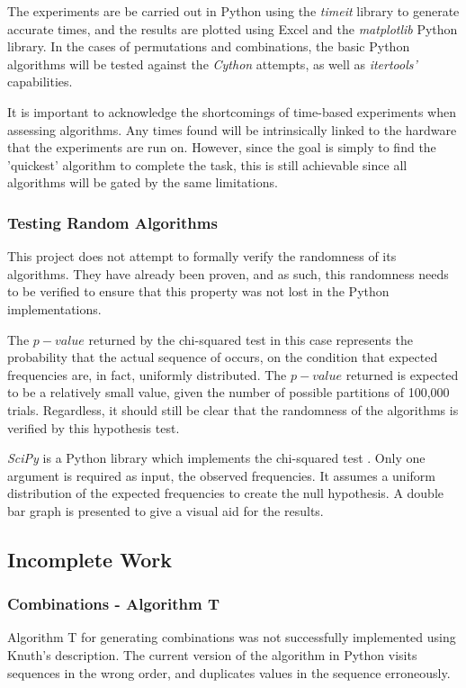 \documentclass[12pt]{article}
\begin{document}
The experiments are be carried out in Python using the \textit{timeit} library to generate accurate times, and the results are plotted using Excel and the \textit{matplotlib} Python library. In the cases of permutations and combinations, the basic Python algorithms will be tested against the \textit{Cython} attempts, as well as \textit{itertools'} capabilities.

It is important to acknowledge the shortcomings of time-based experiments when assessing algorithms. Any times found will be intrinsically linked to the hardware that the experiments are run on. However, since the goal is simply to find the 'quickest' algorithm to complete the task, this is still achievable since all algorithms will be gated by the same limitations.

\subsubsection{Testing Random Algorithms}
This project does not attempt to formally verify the randomness of its algorithms. They have already been proven, and as such, this randomness needs to be verified to ensure that this property was not lost in the Python implementations.

The \(p-value\) returned by the chi-squared test in this case represents the probability that the actual sequence of occurs, on the condition that expected frequencies are, in fact, uniformly distributed. The \(p-value\) returned is expected to be a relatively small value, given the number of possible partitions of 100,000 trials. Regardless, it should still be clear that the randomness of the algorithms is verified by this hypothesis test. 

\textit{SciPy} is a Python library which implements the chi-squared test \cite{chi_square}. Only one argument is required as input, the observed frequencies. It assumes a uniform distribution of the expected frequencies to create the null hypothesis. A double bar graph is presented to give a visual aid for the results.

\subsection{Incomplete Work}
\subsubsection{Combinations - Algorithm T}
Algorithm T for generating combinations \cite{comb_T} was not successfully implemented using Knuth's description. The current version of the algorithm in Python visits sequences in the wrong order, and duplicates values in the sequence erroneously. 
\end{document}
